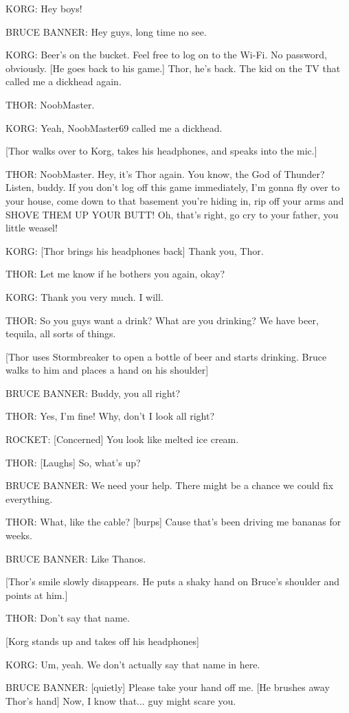 KORG: Hey boys!

BRUCE BANNER: Hey guys, long time no see.

KORG: Beer's on the bucket. Feel free to log on to the Wi-Fi. No password, obviously. [He goes back to his game.] Thor, he's back. The kid on the TV that called me a dickhead again.

THOR: NoobMaster.

KORG: Yeah, NoobMaster69 called me a dickhead.

[Thor walks over to Korg, takes his headphones, and speaks into the mic.]

THOR: NoobMaster. Hey, it's Thor again. You know, the God of Thunder? Listen, buddy. If you don't log off this game immediately, I'm gonna fly over to your house, come down to that basement you're hiding in, rip off your arms and SHOVE THEM UP YOUR BUTT! Oh, that's right, go cry to your father, you little weasel!

KORG: [Thor brings his headphones back] Thank you, Thor.

THOR: Let me know if he bothers you again, okay?

KORG: Thank you very much. I will.

THOR: So you guys want a drink? What are you drinking? We have beer, tequila, all sorts of things.

[Thor uses Stormbreaker to open a bottle of beer and starts drinking. Bruce walks to him and places a hand on his shoulder]

BRUCE BANNER: Buddy, you all right?

THOR: ​​​​​​Yes, I'm fine! Why, don't I look all right?

ROCKET: [Concerned] You look like melted ice cream.

THOR: [Laughs] So, what's up?

BRUCE BANNER: We need your help. There might be a chance we could fix everything.

THOR: What, like the cable? [burps] Cause that's been driving me bananas for weeks.

BRUCE BANNER: Like Thanos.

[Thor's smile slowly disappears. He puts a shaky hand on Bruce's shoulder and points at him.]

THOR: Don't say that name.

[Korg stands up and takes off his headphones]

KORG: Um, yeah. We don't actually say that name in here.

BRUCE BANNER: [quietly] Please take your hand off me. [He brushes away Thor's hand] Now, I know that... guy might scare you.

